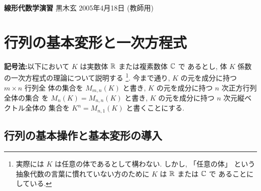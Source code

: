 \documentclass[12pt,twoside]{jarticle}
\newcommand\commentout[1]{#1}
\newcommand\commentout[1]{}
\begin{document}

%
%



\noindent
{\Large\bf 線形代数学演習}
\hfill
{\large 黒木玄}
\qquad
2005年4月18日
\commentout{\quad (教師用)}


\tableofcontents

\section{行列の基本変形と一次方程式}

\noindent
{\large 
{\bf 記号法:}\enspace 以下において $K$ は実数体 ${\mathbb R}$ または複素数体 ${\mathbb C}$ で
あるとし, 体 $K$ 係数の一次方程式の理論について説明する%
\footnote{実際には $K$ は任意の体であるとして構わない. しかし, 「任意の体」
  という抽象代数の言葉に慣れていない方のために $K$ は ${\mathbb R}$ または ${\mathbb C}$ で
  あることにしている.}.  今まで通り, $K$ の元を成分に持つ $m\times n$ 行列全
体の集合を $M_{m,n}(K)$ と書き, $K$ の元を成分に持つ $n$ 次正方行列全体の集合
を $M_n(K)=M_{n,n}(K)$ と書き, $K$ の元を成分に持つ $n$ 次元縦ベクトル全体の
集合を $K^n = M_{n,1}(K)$ と書くことにする.
}


\subsection{行列の基本操作と基本変形の導入}
\label{sec:elem-op-tr}
\end{document}
